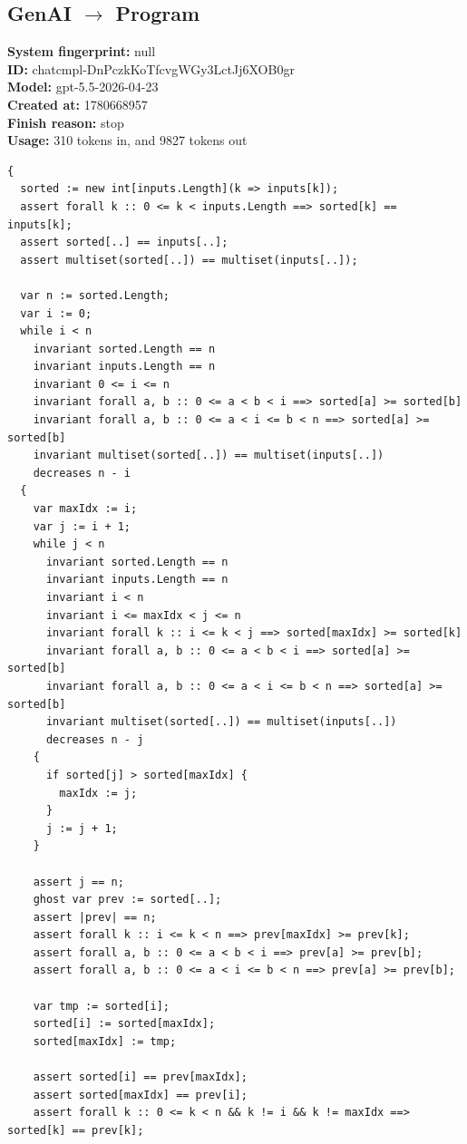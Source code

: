 \documentclass{article}
\begin{document}
\subsection*{GenAI $\rightarrow$ Program}
\textbf{System fingerprint: }null
\\\textbf{ID: }chatcmpl-DnPczkKoTfcvgWGy3LctJj6XOB0gr
\\\textbf{Model: }gpt-5.5-2026-04-23
\\\textbf{Created at: }1780668957
\\\textbf{Finish reason: }stop
\\\textbf{Usage: }310 tokens in, and 9827 tokens out
\begin{lstlisting}
{
  sorted := new int[inputs.Length](k => inputs[k]);
  assert forall k :: 0 <= k < inputs.Length ==> sorted[k] == inputs[k];
  assert sorted[..] == inputs[..];
  assert multiset(sorted[..]) == multiset(inputs[..]);

  var n := sorted.Length;
  var i := 0;
  while i < n
    invariant sorted.Length == n
    invariant inputs.Length == n
    invariant 0 <= i <= n
    invariant forall a, b :: 0 <= a < b < i ==> sorted[a] >= sorted[b]
    invariant forall a, b :: 0 <= a < i <= b < n ==> sorted[a] >= sorted[b]
    invariant multiset(sorted[..]) == multiset(inputs[..])
    decreases n - i
  {
    var maxIdx := i;
    var j := i + 1;
    while j < n
      invariant sorted.Length == n
      invariant inputs.Length == n
      invariant i < n
      invariant i <= maxIdx < j <= n
      invariant forall k :: i <= k < j ==> sorted[maxIdx] >= sorted[k]
      invariant forall a, b :: 0 <= a < b < i ==> sorted[a] >= sorted[b]
      invariant forall a, b :: 0 <= a < i <= b < n ==> sorted[a] >= sorted[b]
      invariant multiset(sorted[..]) == multiset(inputs[..])
      decreases n - j
    {
      if sorted[j] > sorted[maxIdx] {
        maxIdx := j;
      }
      j := j + 1;
    }

    assert j == n;
    ghost var prev := sorted[..];
    assert |prev| == n;
    assert forall k :: i <= k < n ==> prev[maxIdx] >= prev[k];
    assert forall a, b :: 0 <= a < b < i ==> prev[a] >= prev[b];
    assert forall a, b :: 0 <= a < i <= b < n ==> prev[a] >= prev[b];

    var tmp := sorted[i];
    sorted[i] := sorted[maxIdx];
    sorted[maxIdx] := tmp;

    assert sorted[i] == prev[maxIdx];
    assert sorted[maxIdx] == prev[i];
    assert forall k :: 0 <= k < n && k != i && k != maxIdx ==> sorted[k] == prev[k];


\end{lstlisting}
\end{document}
